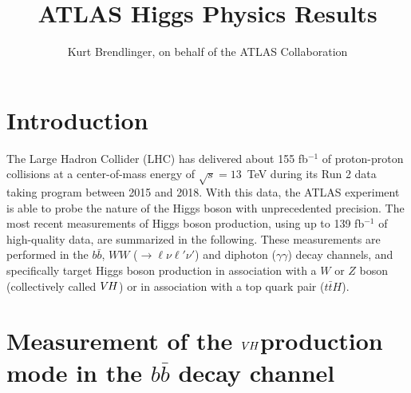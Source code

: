 \documentclass{moriond}
\def\vh{\texorpdfstring{\ensuremath{V\kern -0.1em H}\xspace}{VH\xspace}}
\begin{document}
\linenumbers

\vspace*{4cm}
\title{ATLAS Higgs Physics Results}

\author{ Kurt Brendlinger, on behalf of the ATLAS Collaboration }

\address{~\\DESY, Notkestra\ss e 85,\\ 22607 Hamburg, Germany}

\maketitle{}

\section{Introduction}

The Large Hadron Collider (LHC) \cite{Evans:2008zzb} has delivered about 155 fb$^{-1}$ of proton-proton
collisions at a center-of-mass energy of $\sqrt{s}=13$~TeV during its Run 2 data taking program
between 2015 and 2018.
With this data, the
ATLAS experiment \cite{PERF-2007-01,ATLAS-TDR-19} is able to probe the nature of the Higgs boson with unprecedented
precision. The most recent measurements of Higgs boson production, using up
to 139 fb$^{-1}$ of high-quality data, are summarized in the following. These measurements are performed in the $b\bar b$,
$WW$ (${\rightarrow}\ell\nu\ell'\nu'$) and diphoton ($\gamma\gamma$) decay channels, and specifically
target Higgs boson production in association with a $W$ or $Z$ boson (collectively called \vh) or in association with a top
quark pair ($t\bar tH$).

\section{Measurement of the \vh production mode in the $b\bar b$ decay channel}\label{sec:vh_bb}
\end{document}
